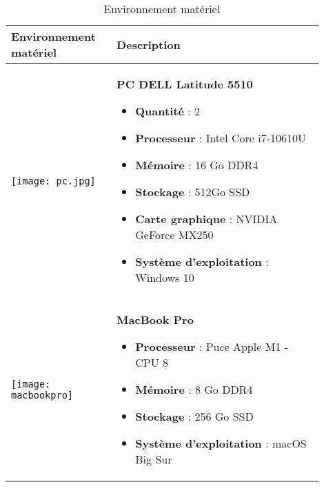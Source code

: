 \begin{longtable}{|p{0.3\linewidth}|p{0.6\linewidth}|}
  
  \caption{Environnement matériel}\label{tab:environnement_materiel}\\
      \hline
      Environnement matériel & Description \\
      \hline
      
      \begin{minipage}{\linewidth}
       \texttt{[image: pc.jpg]}
      \end{minipage} &
      \begin{minipage}{\linewidth}
        \vspace{0.2cm}
        \textbf{PC DELL Latitude 5510}
        \begin{itemize}
          \item \textbf{Quantité} : 2
          \item \textbf{Processeur} : Intel Core i7-10610U 
          \item \textbf{Mémoire} : 16 Go DDR4 
          \item \textbf{Stockage} : 512Go SSD 
          \item \textbf{Carte graphique} : NVIDIA GeForce MX250 
          \item \textbf{Système d'exploitation} : Windows 10 
        \end{itemize}
        \vspace{0.2cm}
      \end{minipage} \\
      \hline
      \begin{minipage}{\linewidth}
       \texttt{[image: macbookpro]}
      \end{minipage} &
      \begin{minipage}{\linewidth}
        \vspace{0.2cm}
        \textbf{MacBook Pro}
        \begin{itemize}
          \item \textbf{Processeur} : Puce Apple M1 - CPU 8 
          \item \textbf{Mémoire} : 8 Go DDR4
          \item \textbf{Stockage} : 256 Go SSD
          \item \textbf{Système d'exploitation} : macOS Big Sur 
        \end{itemize}
        \vspace{0.2cm}
      \end{minipage} \\



\end{longtable}
